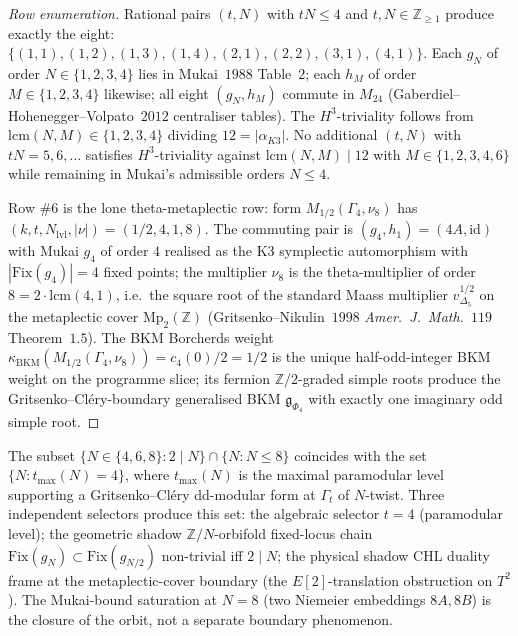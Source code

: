 \begin{proof}[Row enumeration]
Rational pairs $(t, N)$ with $tN \leq 4$ and $t, N \in \mathbb{Z}_{\geq 1}$ produce exactly the eight: $\{(1, 1), (1, 2), (1, 3), (1, 4), (2, 1), (2, 2), (3, 1), (4, 1)\}$. Each $g_N$ of order $N \in \{1, 2, 3, 4\}$ lies in Mukai~$1988$ Table~$2$; each $h_M$ of order $M \in \{1, 2, 3, 4\}$ likewise; all eight $(g_N, h_M)$ commute in $M_{24}$ (Gaberdiel--Hohenegger--Volpato~$2012$ centraliser tables). The $H^3$-triviality follows from $\mathrm{lcm}(N, M) \in \{1, 2, 3, 4\}$ dividing $12 = |\alpha_{K3}|$. No additional $(t, N)$ with $tN = 5, 6, \ldots$ satisfies $H^3$-triviality against $\mathrm{lcm}(N, M) \mid 12$ with $M \in \{1, 2, 3, 4, 6\}$ while remaining in Mukai's admissible orders $N \leq 4$.

Row $\#6$ is the lone theta-metaplectic row: form $M_{1/2}(\Gamma_4, \nu_8)$ has $(k, t, N_{\mathrm{lvl}}, |\nu|) = (1/2, 4, 1, 8)$. The commuting pair is $(g_4, h_1) = (4A, \mathrm{id})$ with Mukai $g_4$ of order $4$ realised as the K3 symplectic automorphism with $|\mathrm{Fix}(g_4)| = 4$ fixed points; the multiplier $\nu_8$ is the theta-multiplier of order $8 = 2 \cdot \mathrm{lcm}(4, 1)$, i.e.\ the square root of the standard Maass multiplier $v_{\Delta_5}^{1/2}$ on the metaplectic cover $\mathrm{Mp}_2(\mathbb{Z})$ (Gritsenko--Nikulin~$1998$ \emph{Amer.\ J.\ Math.}~$119$ Theorem~$1.5$). The BKM Borcherds weight $\kappa_{\mathrm{BKM}}(M_{1/2}(\Gamma_4, \nu_8)) = c_4(0)/2 = 1/2$ is the unique half-odd-integer BKM weight on the programme slice; its fermion $\mathbb{Z}/2$-graded simple roots produce the Gritsenko--Cl\'ery-boundary generalised BKM $\mathfrak{g}_{\Phi_4}$ with exactly one imaginary odd simple root.
\end{proof}

\begin{remark}[Paramodular level \texorpdfstring{$t = 4$}{t = 4} as the \texorpdfstring{$2$}{2}-divisibility selector]
\label{rem:k3e-paramodular-t4-selector}
The subset $\{N \in \{4, 6, 8\} : 2 \mid N\} \cap \{N : N \leq 8\}$ coincides with the set $\{N : t_{\max}(N) = 4\}$, where $t_{\max}(N)$ is the maximal paramodular level supporting a Gritsenko--Cl\'ery dd-modular form at $\Gamma_t$ of $N$-twist. Three independent selectors produce this set: the algebraic selector $t = 4$ (paramodular level); the geometric shadow $\mathbb{Z}/N$-orbifold fixed-locus chain $\mathrm{Fix}(g_N) \subset \mathrm{Fix}(g_{N/2})$ non-trivial iff $2 \mid N$; the physical shadow CHL duality frame at the metaplectic-cover boundary (the $E[2]$-translation obstruction on $T^2$). The Mukai-bound saturation at $N = 8$ (two Niemeier embeddings $8A, 8B$) is the closure of the orbit, not a separate boundary phenomenon.
\end{remark}


